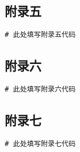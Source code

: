 \documentclass{ctexart}
\begin{document}
\subsection{附录五}
\begin{verbatim}
# 此处填写附录五代码
\end{verbatim}

\subsection{附录六}
\begin{verbatim}
# 此处填写附录六代码
\end{verbatim}

\subsection{附录七}
\begin{verbatim}
# 此处填写附录七代码
\end{verbatim}
\end{document}
